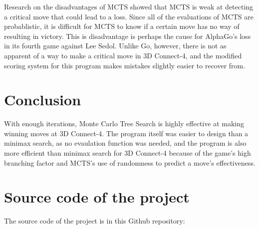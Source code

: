 \documentclass[12pt, a4paper]{article}
\begin{document}
    Research on the disadvantages of MCTS showed that MCTS is weak at detecting a critical move that could lead to a loss. Since all of the evaluations of MCTS are probablistic, it is difficult for MCTS to know if a certain move has no way of resulting in victory. This is disadvantage is perhaps the cause for AlphaGo's loss in its fourth game against Lee Sedol. Unlike Go, however, there is not as apparent of a way to make a critical move in 3D Connect-4, and the modified scoring system for this program makes mistakes slightly easier to recover from. 

    \section{Conclusion}

    With enough iterations, Monte Carlo Tree Search is highly effective at making winning moves at 3D Connect-4. The program itself was easier to design than a minimax search, as no evaulation function was needed, and the program is also more efficient than minimax search for 3D Connect-4 because of the game's high branching factor and MCTS's use of randomness to predict a move's effectiveness.

    \appendix

    \section{Source code of the project}
    The source code of the project is in this Github repository:
\end{document}
